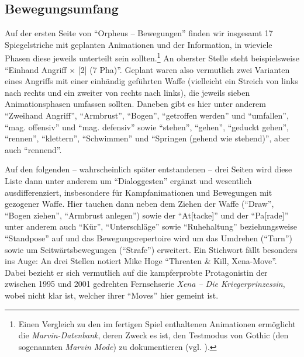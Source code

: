 \documentclass[a5paper,pagesize]{scrbook}
\begin{document}
\subsection{Bewegungsumfang}\label{sec:orpheus_darstellung_bewegungsumfang}
Auf der ersten Seite von \enquote{Orpheus -- Bewegungen} finden wir insgesamt 17 Spiegelstriche mit geplanten Animationen und der Information, in wieviele Phasen diese jeweils unterteilt sein sollten.\footnote{Einen Vergleich zu den im fertigen Spiel enthaltenen Animationen ermöglicht die \textit{Marvin-Datenbank}, deren Zweck es ist, den Testmodus von Gothic (den sogenannten \textit{Marvin Mode}) zu dokumentieren (vgl. \autocite{sillus_marvin_2020}).}
An oberster Stelle steht beispielsweise \enquote{Einhand Angriff × [2] (7 Pha)}.
Geplant waren also vermutlich zwei Varianten eines Angriffs mit einer einhändig geführten Waffe (vielleicht ein Streich von links nach rechts und ein zweiter von rechts nach links), die jeweils sieben Animationsphasen umfassen sollten.
Daneben gibt es hier unter anderem \enquote{Zweihand Angriff}, \enquote{Armbrust}, \enquote{Bogen}, \enquote{getroffen werden} und \enquote{umfallen}, \enquote{mag. offensiv} und \enquote{mag. defensiv} sowie \enquote{stehen}, \enquote{gehen}, \enquote{geduckt gehen}, \enquote{rennen}, \enquote{klettern}, \enquote{Schwimmen} und \enquote{Springen (gehend wie stehend)}, aber auch \enquote{rennend}.

Auf den folgenden -- wahrscheinlich später entstandenen -- drei Seiten wird diese Liste dann unter anderem um \enquote{Dialoggesten} ergänzt und wesentlich ausdifferenziert, insbesondere für Kampfanimationen und Bewegungen mit gezogener Waffe.
Hier tauchen dann neben dem Ziehen der Waffe (\enquote{Draw}, \enquote{Bogen ziehen}, \enquote{Armbrust anlegen}) sowie der \enquote{At[tacke]} und der \enquote{Pa[rade]} unter anderem auch \enquote{Kür}, \enquote{Unterschläge} sowie \enquote{Ruhehaltung} beziehungsweise \enquote{Standpose} auf und das Bewegungsrepertoire wird um das Umdrehen (\enquote{Turn}) sowie um Seitwärtsbewegungen (\enquote{Strafe}) erweitert.
Ein Stichwort fällt besonders ins Auge:
An drei Stellen notiert Mike Hoge \enquote{Threaten \& Kill, Xena-Move}.
Dabei bezieht er sich vermutlich auf die kampferprobte Protagonistin der zwischen 1995 und 2001 gedrehten Fernsehserie \textit{Xena -- Die Kriegerprinzessin}, wobei nicht klar ist, welcher ihrer \enquote{Moves} hier gemeint ist. %
\end{document}
